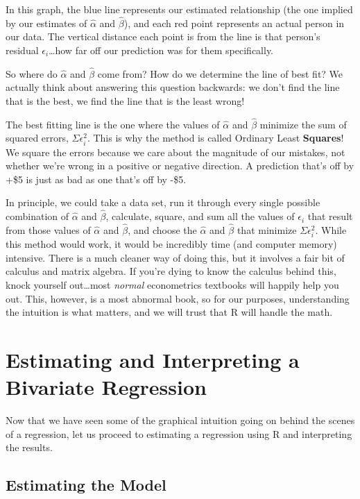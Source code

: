 \documentclass[
  letterpaper,
]{book}
\begin{document}
In this graph, the blue line represents our estimated relationship (the
one implied by our estimates of \(\hat{\alpha}\) and \(\hat{\beta}\)),
and each red point represents an actual person in our data. The vertical
distance each point is from the line is that person's residual
\(\epsilon_i\)\ldots how far off our prediction was for them
specifically.

So where do \(\hat{\alpha}\) and \(\hat{\beta}\) come from? How do we
determine the line of best fit? We actually think about answering this
question backwards: we don't find the line that is the best, we find the
line that is the least wrong!

The best fitting line is the one where the values of \(\hat{\alpha}\)
and \(\hat{\beta}\) minimize the sum of squared errors,
\(\Sigma{\epsilon_i^2}\). This is why the method is called Ordinary
Least \textbf{Squares}! We square the errors because we care about the
magnitude of our mistakes, not whether we're wrong in a positive or
negative direction. A prediction that's off by +\$5 is just as bad as
one that's off by -\$5.

In principle, we could take a data set, run it through every single
possible combination of \(\hat{\alpha}\) and \(\hat{\beta}\), calculate,
square, and sum all the values of \(\epsilon_i\) that result from those
values of \(\hat{\alpha}\) and \(\hat{\beta}\), and choose the
\(\hat{\alpha}\) and \(\hat{\beta}\) that minimize
\(\Sigma{\epsilon_i^2}\). While this method would work, it would be
incredibly time (and computer memory) intensive. There is a much cleaner
way of doing this, but it involves a fair bit of calculus and matrix
algebra. If you're dying to know the calculus behind this, knock
yourself out\ldots most \emph{normal} econometrics textbooks will
happily help you out. This, however, is a most abnormal book, so for our
purposes, understanding the intuition is what matters, and we will trust
that R will handle the math.

\section{Estimating and Interpreting a Bivariate
Regression}\label{estimating-and-interpreting-a-bivariate-regression}

Now that we have seen some of the graphical intuition going on behind
the scenes of a regression, let us proceed to estimating a regression
using R and interpreting the results.

\subsection{Estimating the Model}\label{estimating-the-model}
\end{document}
